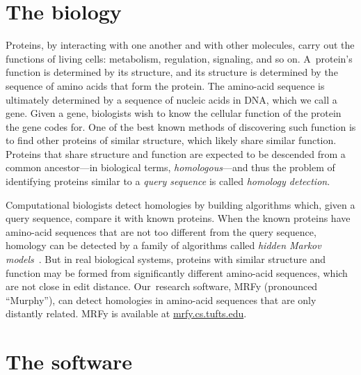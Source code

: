 \documentclass[]{jfp1}
\newcommand\secref[1]{Section~\ref{sec:#1}}
\let\cite\citep
\begin{document}
\section{The biology}

Proteins, by
interacting with one another and with other 
molecules, carry out the functions of living cells: metabolism, regulation, 
signaling, and so on.
A~protein's function is determined by its structure, 
and its structure is determined by the sequence of amino acids that
form the protein.
The amino-acid sequence is ultimately determined by a sequence of
nucleic acids in DNA, which we call a gene.
Given a gene, biologists wish to know the cellular
function of the protein the gene codes for.
One of the best known methods of discovering such function is
to find other proteins of 
similar structure, which likely share similar function.
Proteins that share structure and function are expected to be
descended from a common ancestor---in biological terms, \emph{homologous}---and
thus
the problem of identifying proteins similar to a \textit{query sequence} is called 
\textit{homology detection}.




Computational biologists detect homologies by building 
algorithms which, given a {query sequence}, %
compare it with known proteins.
When the known proteins have amino-acid sequences that
are not too different from the query sequence, homology can be
detected by
a family of algorithms called 
\textit{hidden Markov models}~\cite{Eddy:1998ut}.
But in real biological systems,
proteins with similar structure and function may be formed from significantly 
different amino-acid sequences, which are not close in edit distance.
Our~research software, MRFy (pronounced
``Murphy''), can detect homologies 
in amino-acid sequences that are only distantly related.
MRFy is available at \url{mrfy.cs.tufts.edu}.
%
%

%
%
%


\section{The software}
\end{document}
